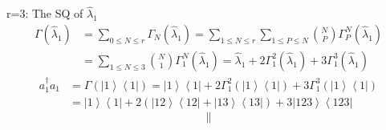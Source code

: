 \documentclass[aps,preprint]{revtex4}%
\begin{document}
r=3: The SQ of $\hat{\lambda}_{1}$
\begin{align}
\Gamma\left(  \hat{\lambda}_{1}\right)    & =\sum_{0\leq N\leq r}\Gamma
_{N}\left(  \hat{\lambda}_{1}\right)  =\sum_{1\leq N\leq r}\sum_{1\leq P\leq
N}\binom{N}{P}\Gamma_{P}^{N}\left(  \hat{\lambda}_{1}\right)  \nonumber\\
& =\sum_{1\leq N\leq3}\binom{N}{1}\Gamma_{1}^{N}\left(  \hat{\lambda}%
_{1}\right)  =\hat{\lambda}_{1}+2\Gamma_{1}^{2}\left(  \hat{\lambda}%
_{1}\right)  +3\Gamma_{1}^{3}\left(  \hat{\lambda}_{1}\right)
\end{align}%
\begin{align}
a_{1}^{\dagger}a_{1}  & =\Gamma\left(  \left\vert 1\right\rangle \left\langle
1\right\vert \right)  =\left\vert 1\right\rangle \left\langle 1\right\vert
+2\Gamma_{1}^{2}\left(  \left\vert 1\right\rangle \left\langle 1\right\vert
\right)  +3\Gamma_{1}^{3}\left(  \left\vert 1\right\rangle \left\langle
1\right\vert \right)  \nonumber\\
& =\left\vert 1\right\rangle \left\langle 1\right\vert +2\left(  \left\vert
12\right\rangle \left\langle 12\right\vert +\left\vert 13\right\rangle
\left\langle 13\right\vert \right)  +3\left\vert 123\right\rangle \left\langle
123\right\vert
\end{align}%
\[
\parallel
\]
%
\end{document}
